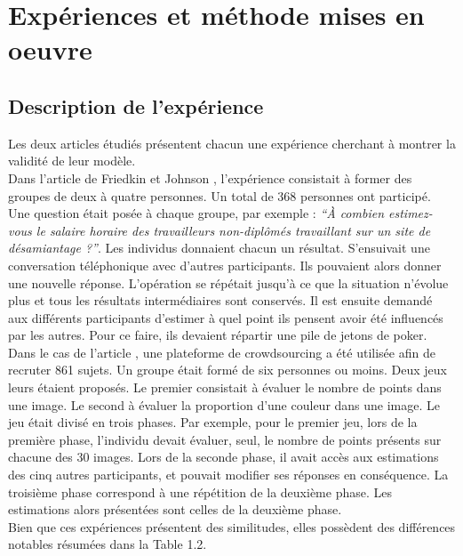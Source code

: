\documentclass{scrreprt}
\begin{document}
\section{Expériences et méthode mises en oeuvre}


\subsection{Description de l'expérience}

Les deux articles étudiés présentent chacun une expérience cherchant à montrer la validité de leur modèle.\\

Dans l’article de Friedkin et Johnson \cite{FJ}, l’expérience consistait à former des groupes de deux à quatre personnes. Un total de 368 personnes ont participé. Une question était posée à chaque groupe, par exemple : \textit{ ``À combien estimez-vous le salaire horaire des travailleurs non-diplômés  travaillant sur un site de désamiantage ?''}. Les individus donnaient chacun un résultat. S’ensuivait une conversation téléphonique avec d’autres participants. Ils pouvaient alors donner une nouvelle réponse. L’opération se répétait jusqu’à ce que la situation n’évolue plus et tous les résultats intermédiaires sont conservés. Il est ensuite demandé aux différents participants d’estimer à quel point ils pensent avoir été influencés par les autres. Pour ce faire, ils devaient répartir une pile de jetons de poker.\\

Dans le cas de l’article \cite{VMG}, une plateforme de crowdsourcing a été utilisée afin de recruter 861 sujets. Un groupe était formé de six personnes ou moins. Deux jeux leurs étaient proposés. Le premier consistait à évaluer le nombre de points dans une image. Le second à évaluer la proportion d'une couleur dans une image. Le jeu était divisé en trois phases. Par exemple, pour le premier jeu, lors de la première phase, l'individu devait évaluer, seul, le nombre de points présents sur chacune des 30 images. Lors de la seconde phase, il avait accès aux estimations des cinq autres participants, et pouvait modifier ses réponses en conséquence. La troisième phase correspond à une répétition de la deuxième phase. Les estimations alors présentées sont celles de la deuxième phase. \\

Bien que ces expériences présentent des similitudes, elles possèdent des différences notables résumées dans la Table 1.2.\\
\end{document}
